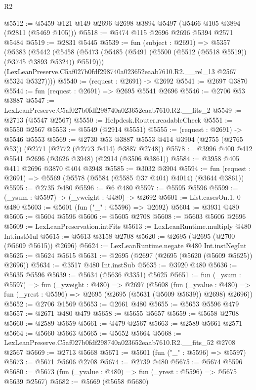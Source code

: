 \begin{lexlean}{R2}
\begin{coremodule}
@5512 := @5459 @121 @149 @2696 @2698 @3894 @5497 (@5466 @105 @3894 (@2811 (@5469 @105)))
@5518 := @5474 @115 @2696 @2696 @5394 @2571 @5484
@5519 := @2831 @5445
@5539 := fun (subject : @2691) =>
  @5357
    (@5383
      (@5442
        (@5458
          (@5473 (@5485 (@5491 (@5500 (@5512 (@5518 @5519)) (@3745 @3893 @5324)) @5519)))
          (LexLeanPreserve.C5af027b0fdf298740a023652eaab7610.R2.__rel_13 @2567 @5324 @5327))))
@5540 := (request : @2691) -> @2692
@5541 := @2697 @3870
@5544 := fun (request : @2691) => @2695 @5541 @2696
@5546 := @2706 @53 @3887
@5547 := LexLeanPreserve.C5af027b0fdf298740a023652eaab7610.R2.__fits_2
@5549 := @2713 (@5547 @2567)
@5550 := Helpdesk.Router.readableCheck
@5551 := @5550 @2567
@5553 := @5549 (@2914 @5551)
@5555 := (request : @2691) -> @5546 @5553
@5569 := @2730
    @53
    @3887
    @5553
    @414
    @3904
    (@2755 (@2765 @53))
    (@2771 (@2772 (@2773 @414) @3887 @2748))
@5578 := @3996 @400 @412 @5541 @2696 (@3626 @3948) (@2914 (@3506 @3861))
@5584 := @3958 @405 @411 @2696 @3870 @404 @3948
@5585 := @3032 @3904
@5594 := fun (request : @2691) => @5569 (@5578 (@5584 (@5585 @37 @404) @4014) (@3644 @3861))
@5595 := @2735 @480
@5596 := @6 @480
@5597 := @5595 @5596
@5599 := (_ysum : @5597) -> (_yweight : @480) -> @2692
@5601 := List.casesOn.{1, 0} @480
@5603 := @5601 (fun ("_" : @5596) => @2692)
@5604 := @3931 @480
@5605 := @5604 @5596
@5606 := @5605 @2708
@5608 := @5603 @5606 @2696
@5609 := LexLeanPreservation.intFits
@5613 := LexLeanRuntime.multiply @480 Int.instMul
@5615 := @5613 @3158 @2708
@5620 := @2695 (@2695 (@2700 (@5609 @5615)) @2696)
@5624 := LexLeanRuntime.negate @480 Int.instNegInt
@5625 := @5624 @5615
@5631 := @2695 (@2697 (@2695 (@5620 (@5609 @5625)) @2696))
@5634 := @3517 @480 Int.instSub
@5635 := @3920 @480
@5636 := @5635 @5596
@5639 := @5634 (@5636 @3351) @5625
@5651 := fun (_ysum : @5597) =>
  fun (_yweight : @480) =>
  @2697
    (@5608
      (fun (_yvalue : @480) =>
      fun (_yrest : @5596) => @2695 (@2695 (@5631 (@5609 @5639)) @2698) @2696))
@5652 := @2706 @1569
@5653 := @2661 @480
@5655 := @5653 @5596 @479
@5657 := @2671 @480 @479
@5658 := @5655 @5657
@5659 := @5658 @2708
@5660 := @2589 @5659
@5661 := @479 @2567
@5663 := @2589 @5661 @2571
@5664 := @5660 @5663
@5665 := @5652 @5664
@5668 := LexLeanPreserve.C5af027b0fdf298740a023652eaab7610.R2.__fits_52 @2708 @2567
@5669 := @2713 @5668
@5671 := @5601 (fun ("_" : @5596) => @5597)
@5673 := @5671 @5606 @2708
@5674 := @2739 @480
@5675 := @5674 @5596
@5680 := @5673 (fun (_yvalue : @480) => fun (_yrest : @5596) => @5675 @5639 @2567)
@5682 := @5669 (@5658 @5680)

\end{coremodule}
\end{lexlean}
